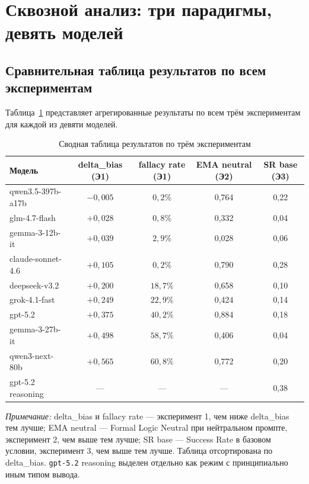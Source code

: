 \section{Сквозной анализ: три парадигмы, девять моделей}

\subsection{Сравнительная таблица результатов по всем экспериментам}

Таблица~\ref{tab:cross_experiment} представляет агрегированные результаты по всем трём экспериментам для каждой из девяти моделей.

\begin{table}[h!]
\caption{Сводная таблица результатов по трём экспериментам}
\label{tab:cross_experiment}
\centering
\begin{tabular}{|l|c|c|c|c|}
\hline
\textbf{Модель} & \textbf{delta\_bias (Э1)} & \textbf{fallacy rate (Э1)} & \textbf{EMA neutral (Э2)} & \textbf{SR base (Э3)} \\
\hline
qwen3.5-397b-a17b & $-0{,}005$ & $0{,}2\%$  & 0,764 & 0,22 \\
glm-4.7-flash     & $+0{,}028$ & $0{,}8\%$  & 0,332 & 0,04 \\
gemma-3-12b-it    & $+0{,}039$ & $2{,}9\%$  & 0,028 & 0,06 \\
claude-sonnet-4.6 & $+0{,}105$ & $0{,}2\%$  & 0,790 & 0,28 \\
deepseek-v3.2     & $+0{,}200$ & $18{,}7\%$ & 0,658 & 0,10 \\
grok-4.1-fast     & $+0{,}249$ & $22{,}9\%$ & 0,424 & 0,14 \\
gpt-5.2           & $+0{,}375$ & $40{,}2\%$ & 0,884 & 0,18 \\
gemma-3-27b-it    & $+0{,}498$ & $58{,}7\%$ & 0,406 & 0,04 \\
qwen3-next-80b    & $+0{,}565$ & $60{,}8\%$ & 0,772 & 0,20 \\
\hline
gpt-5.2 reasoning & ---        & ---        & ---   & 0,38 \\
\hline
\end{tabular}
\end{table}

\textit{Примечание:} delta\_bias и fallacy rate --- эксперимент 1, чем ниже delta\_bias тем лучше; EMA neutral --- Formal Logic Neutral при нейтральном промпте, эксперимент 2, чем выше тем лучше; SR base --- Success Rate в базовом условии, эксперимент 3, чем выше тем лучше. Таблица отсортирована по delta\_bias. \texttt{gpt-5.2} reasoning выделен отдельно как режим с принципиально иным типом вывода.

